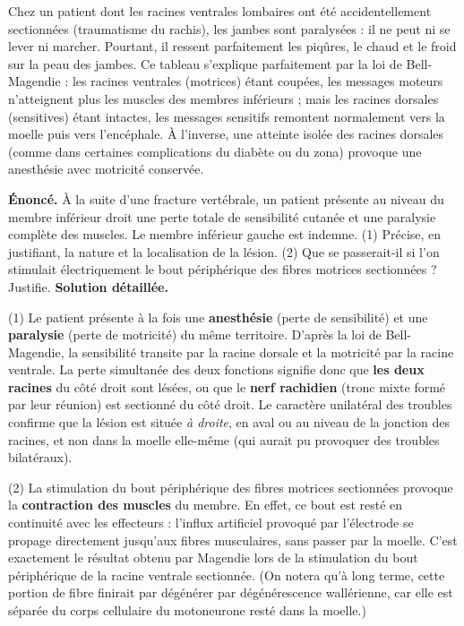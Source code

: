 \documentclass[11pt]{article}
\begin{document}
\begin{exemplebox}
Chez un patient dont les racines ventrales lombaires ont été accidentellement sectionnées (traumatisme du rachis), les jambes sont paralysées : il ne peut ni se lever ni marcher. Pourtant, il ressent parfaitement les piqûres, le chaud et le froid sur la peau des jambes. Ce tableau s'explique parfaitement par la loi de Bell-Magendie : les racines ventrales (motrices) étant coupées, les messages moteurs n'atteignent plus les muscles des membres inférieurs ; mais les racines dorsales (sensitives) étant intactes, les messages sensitifs remontent normalement vers la moelle puis vers l'encéphale. À l'inverse, une atteinte isolée des racines dorsales (comme dans certaines complications du diabète ou du zona) provoque une anesthésie avec motricité conservée.
\end{exemplebox}

\begin{exoresolu}
\textbf{Énoncé.} À la suite d'une fracture vertébrale, un patient présente au niveau du membre inférieur droit une perte totale de sensibilité cutanée et une paralysie complète des muscles. Le membre inférieur gauche est indemne. (1) Précise, en justifiant, la nature et la localisation de la lésion. (2) Que se passerait-il si l'on stimulait électriquement le bout périphérique des fibres motrices sectionnées ? Justifie.
\tcblower
\textbf{Solution détaillée.}

(1) Le patient présente à la fois une \textbf{anesthésie} (perte de sensibilité) et une \textbf{paralysie} (perte de motricité) du même territoire. D'après la loi de Bell-Magendie, la sensibilité transite par la racine dorsale et la motricité par la racine ventrale. La perte simultanée des deux fonctions signifie donc que \textbf{les deux racines} du côté droit sont lésées, ou que le \textbf{nerf rachidien} (tronc mixte formé par leur réunion) est sectionné du côté droit. Le caractère unilatéral des troubles confirme que la lésion est située \emph{à droite}, en aval ou au niveau de la jonction des racines, et non dans la moelle elle-même (qui aurait pu provoquer des troubles bilatéraux).

(2) La stimulation du bout périphérique des fibres motrices sectionnées provoque la \textbf{contraction des muscles} du membre. En effet, ce bout est resté en continuité avec les effecteurs : l'influx artificiel provoqué par l'électrode se propage directement jusqu'aux fibres musculaires, sans passer par la moelle. C'est exactement le résultat obtenu par Magendie lors de la stimulation du bout périphérique de la racine ventrale sectionnée. (On notera qu'à long terme, cette portion de fibre finirait par dégénérer par dégénérescence wallérienne, car elle est séparée du corps cellulaire du motoneurone resté dans la moelle.)
\end{exoresolu}
\end{document}
